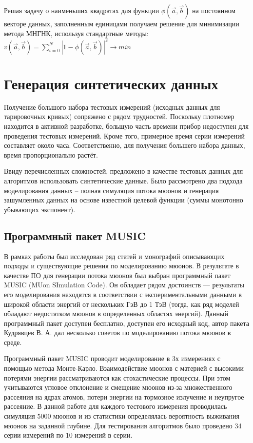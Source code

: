 Решая задачу о наименьших квадратах для функции 
$\phi(\vec{a}, \vec{b})$ на постоянном векторе данных, заполненным
единицами получаем решение для минимизации метода МНГНК, используя стандартные методы: 
$v(\vec{a}, \vec{b}) = \displaystyle\sum_{i=0}^N \left|1 -
\phi(\vec{a}, \vec{b})\right|^2 \rightarrow min$


\section{Генерация синтетических данных}\label{sect2_3}


Получение большого набора тестовых измерений (исходных данных 
для тарировочных кривых) сопряжено с рядом трудностей. Поскольку 
плотномер находится в активной разработке,
большую часть времени прибор недоступен для проведения тестовых
измерений. Кроме того, примерное время серии измерений составляет
около часа. Соответственно, для получения большего набора данных, время пропорционально растёт.


Ввиду перечисленных сложностей, предложено в качестве тестовых
данных для алгоритмов использовать синтетические данные. Было 
рассмотрено два подхода моделирования данных -- 
полная симуляция потока мюонов и генерация зашумленных данных 
на основе известной целевой функции (суммы монотонно убывающих экспонент).


\subsection{Программный пакет MUSIC}\label{subsect2_3_1}

В рамках работы был исследован ряд статей и монографий описывающих подходы и существующие
решения по моделированию мюонов. В результате в качестве ПО для 
генерации потока мюонов
был выбран программный пакет MUSIC (MUon SImulation Code). Он обладает
рядом достоинств --- 
результаты его моделирования находятся в соответствии с экспериментальными
данными в широкой области энергий от нескольких ГэВ до 1 ТэВ (тогда, как ряд
моделей обладают
недостатком мюонов в определенных областях энергий). Данный программный 
пакет доступен бесплатно, доступен его исходный код, автор пакета
Кудрявцев В. А. \cite{kudryavcev} дал несколько 
советов по моделированию потока мюонов в среде.


Программный пакет MUSIC проводит моделирование в 3х измерениях с помощью 
метода Монте-Карло. Взаимодействие мюонов с материей с высокими
потерями энергии рассматриваются как стохастические процессы. При этом учитываются угловое отклонение 
и смещение мюонов из-за множественного рассеяния на ядрах атомов, 
потери энергии на тормозное излучение
и неупругое рассеяние. В данной работе для каждого тестового измерения 
проводилась симуляция 5000 мюонов и из статистики определялась вероятность
выживания мюонов на заданной глубине. 
Для тестирования алгоритмов было проведено 34 серии измерений по 10 измерений в серии. 


